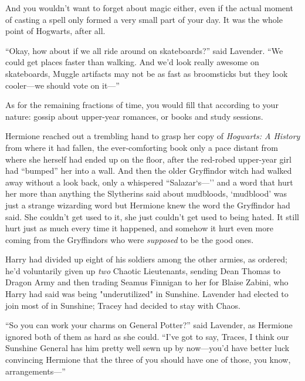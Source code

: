 And you wouldn't want to forget about magic either, even if the actual moment 
of casting a spell only formed a very small part of your day. It was the whole 
point of Hogwarts, after all.

\begin{em}
``Okay, how about if we all ride around on skateboards?'' said Lavender. 
``We could get places faster than walking. And we'd look really awesome on 
skateboards, Muggle artifacts may not be as fast as broomsticks but they look 
cooler---we should vote on it---''
\end{em}

As for the remaining fractions of time, you would fill that according to your 
nature: gossip about upper-year romances, or books and study sessions.

\begin{em}
Hermione reached out a trembling hand to grasp her copy of \emph{Hogwarts: A 
History} from where it had fallen, the ever-comforting book only a pace 
distant from where she herself had ended up on the floor, after the red-robed 
upper-year girl had ``bumped'' her into a wall. And then the older Gryffindor 
witch had walked away without a look back, only a whispered ``Salazar`s---'' and 
a word that hurt her more than anything the Slytherins said about mudbloods, 
`mudblood' was just a strange wizarding word but Hermione knew the word the 
Gryffindor had said. She couldn't get used to it, she just couldn't get used to 
being hated. It still hurt just as much every time it happened, and somehow it 
hurt even more coming from the Gryffindors who were \emph{supposed} to be the 
good ones.
\end{em}

Harry had divided up eight of his soldiers among the other armies, as ordered; 
he'd voluntarily given up \emph{two} Chaotic Lieutenants, sending Dean Thomas 
to Dragon Army and then trading Seamus Finnigan to her for Blaise Zabini, who 
Harry had said was being "underutilized" in Sunshine. Lavender had elected to 
join most of \SPHEW in Sunshine; Tracey had decided to stay with Chaos.

\begin{em}
``So you can work your charms on General Potter?'' said Lavender, as 
Hermione ignored both of them as hard as she could. ``I've got to say, Traces, I 
think our Sunshine General has him pretty well sewn up by now---you'd have 
better luck convincing Hermione that the three of you should have one of those, 
you know, arrangements---''
\end{em}

